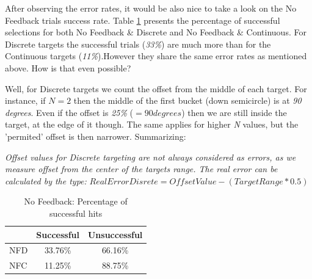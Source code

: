 After observing the error rates, it would be also nice to  take a look on the No Feedback trials success rate. Table \ref{tab:ffHitInside} presents the percentage of successful selections for both No Feedback \& Discrete and No Feedback \& Continuous. For Discrete targets the successful trials (\emph{33\%}) are much more than for the Continuous targets (\emph{11\%}).However they share the same error rates as mentioned above. How is that even possible?

Well, for Discrete targets we count the offset from the middle of each target. For instance,  if $N=2$ then the middle of the first bucket (down semicircle) is at \emph{90 degrees}. Even if the offset is \emph{25\%} ($=90 degrees$) then we are still inside the target, at the edge of it though. The same applies for higher \emph{N} values, but the 'permited'  offset is then narrower. Summarizing:

\emph{Offset values for Discrete targeting are not always considered as errors, as we measure offset from the center of the targets range. The real error can be calculated by the type:}   $RealErrorDisrete = OffsetValue - (TargetRange*0.5)$



\begin{table}[H]
\centering
\begin{tabular}{l || c | c }
 & Successful & Unsuccessful \\
\hline
\hline
NFD & 33.76\% & 66.16\% \\
NFC & 11.25\% & 88.75\% 
\end{tabular}
\caption{No Feedback: Percentage of successful hits}
\label{tab:ffHitInside}
\end{table}






